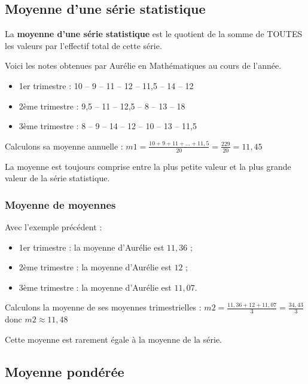 \documentclass[10pt]{article}
\begin{document}
{\subsection{Moyenne d'une série statistique}
\begin{Df}
La \textbf{moyenne d’une série statistique} est le quotient de la somme
de TOUTES les valeurs par l’effectif total de cette série.
\end{Df}


\begin{Ex}
Voici les notes obtenues par Aurélie en Mathématiques au cours de l'année. 
\begin{itemize}
\item	1er trimestre :		10 – 9 – 11 – 12 – 11,5 – 14 – 12
\item	2ème trimestre :	9,5 – 11 – 12,5 – 8 – 13 – 18
\item	3ème trimestre :	8 – 9 – 14 – 12 – 10 – 13 – 11,5
\end{itemize}
Calculons sa moyenne annuelle :
		$m1 =\frac{10+9+11+\ldots{}+11,5}{20}=\frac{229}{20}=11,45$ 
\end{Ex}		
\begin{Rq}
La moyenne est toujours comprise entre la plus petite valeur
et la plus grande valeur de la série statistique.
\end{Rq}		
		
\subsubsection{Moyenne de moyennes}
Avec l'exemple précédent :
\begin{itemize}
\item 		1er trimestre :	  la moyenne d'Aurélie est $11,36$ ;
\item		2ème trimestre : la moyenne d'Aurélie est $12$ ;
\item		3ème trimestre : la moyenne d'Aurélie est $11,07$.
\end{itemize}
Calculons la moyenne de ses moyennes trimestrielles :
		$m2 =\frac{11,36+12+11,07}{3}=\frac{34,43}{3}$ donc  		$m2\approx 11,48$
		
\begin{Rq}	Cette moyenne est rarement égale à la moyenne de la série.
\end{Rq}

\subsection{Moyenne pondérée}

}
\end{document}
